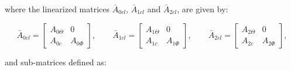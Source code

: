 \documentclass[main.tex]{subfiles}
\begin{document}
	where the linearized matrices $\bar{A}_{0cl}$, $\bar{A}_{1cl}$ and $\bar{A}_{2cl}$, are given by:
	
	\begin{equation}
		\bar{A}_{0cl} = 
		\begin{bmatrix}
			A_{0\Theta} & 0 \\
			A_{0c} & A_{0\Phi}
		\end{bmatrix}, \qquad
		\bar{A}_{1cl} =
		\begin{bmatrix}
			A_{1\Theta} & 0 \\
			A_{1c} & A_{1\Phi}
		\end{bmatrix}, \qquad
		\bar{A}_{2cl} =
		\begin{bmatrix}
			A_{2\Theta} & 0 \\
			A_{2c} & A_{2\Phi} 
		\end{bmatrix}, \label{eq:LinearMatrices}
	\end{equation}
	
	and sub-matrices defined as:
	
\end{document}
